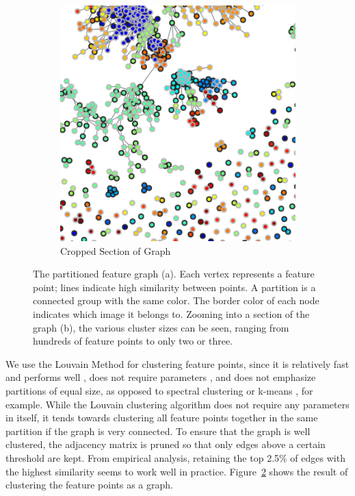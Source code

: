 \documentclass[conference]{IEEEtran}
\begin{document}
\begin{figure}[h]
	\begin{subfigure}{0.7\columnwidth}
		\includegraphics[width=\columnwidth]{images/MMC_graph_cropped}
		\caption{Cropped Section of Graph}
		\label{fig:cropped_graph}
	\end{subfigure}%
	\caption{The partitioned feature graph (a). Each vertex represents a 
		feature point; lines indicate high similarity between 
		points. A partition is a connected group with the same color. The border color of each node 
		indicates which image it belongs to.  Zooming into a section of the graph (b), the various cluster sizes can be seen, ranging from 
	hundreds of feature points to only two or three.}
	\label{fig:graph}
\end{figure}

We use the Louvain Method \cite{blondel2008} for clustering feature 
points, since it is relatively fast and performs 
well \cite{lancichinetti2009}, does not require 
parameters \cite{blondel2008}, and does not emphasize partitions of equal 
size, as opposed to spectral clustering or 
k-means \cite{von2007}, for example.
While the Louvain clustering algorithm does not require any parameters in 
itself, it tends towards clustering all feature points together in the 
same partition if the graph is very connected.  To ensure that the graph 
is well clustered, the adjacency matrix is pruned so that only edges above a 
certain threshold are kept. From empirical analysis, retaining the top 
2.5\% of edges with the highest similarity seems to work well in 
practice. Figure~\ref{fig:graph} shows the result of clustering the 
feature points as a graph.
%
\end{document}
